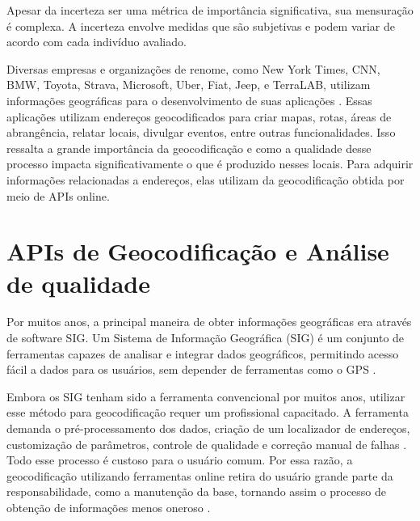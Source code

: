 Apesar da incerteza ser uma métrica de importância significativa, sua mensuração é complexa. A incerteza envolve medidas que são subjetivas e podem variar de acordo com cada indivíduo avaliado. 


Diversas empresas e organizações de renome, como New York Times, CNN, BMW, Toyota, Strava, Microsoft, Uber, Fiat, Jeep, e TerraLAB,  utilizam informações geográficas para o desenvolvimento de suas aplicações \cite{ors, terralab, mapbox, tomtom}. Essas aplicações utilizam endereços geocodificados para criar mapas, rotas, áreas de abrangência, relatar locais, divulgar eventos, entre outras funcionalidades. Isso ressalta a grande importância da geocodificação e como a qualidade desse processo impacta significativamente o que é produzido nesses locais. Para adquirir informações relacionadas a endereços, elas utilizam da geocodificação obtida por meio de APIs online.

\section{APIs de Geocodificação e Análise de qualidade}

Por muitos anos, a principal maneira de obter informações geográficas era através de software SIG. Um Sistema de Informação Geográfica (SIG) é um conjunto de ferramentas capazes de analisar e integrar dados geográficos, permitindo acesso fácil a dados para os usuários, sem depender de ferramentas como o GPS \cite{stein2021geoprocessamento}.

Embora os SIG tenham sido a ferramenta convencional por muitos anos, utilizar esse método para geocodificação requer um profissional capacitado. A ferramenta demanda o pré-processamento dos dados, criação de um localizador de endereços, customização de parâmetros, controle de qualidade e correção manual de falhas \cite{Chow2016}. Todo esse processo é custoso para o usuário comum. Por essa razão, a geocodificação utilizando ferramentas online retira do usuário grande parte da responsabilidade, como a manutenção da base, tornando assim o processo de obtenção de informações menos oneroso \cite{Chow2016}.

